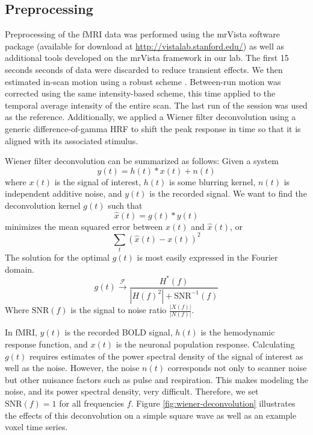 \documentclass[preprint,5p,authoryear]{elsarticle}
\begin{document}
\subsection{Preprocessing}
Preprocessing of the fMRI data was performed using the mrVista software package (available for download at \url{http://vistalab.stanford.edu/}) as well as additional tools developed on the mrVista framework in our lab. 
The first 15 seconds seconds of data  were discarded to reduce transient effects.
We then estimated in-scan motion using a robust scheme \citep{Nestares-and-Heeger-2000}. 
Between-run motion was corrected using the same intensity-based scheme, this time applied to the temporal average intensity of the entire scan. 
The last run of the session was used as the reference. 
Additionally, we applied a Wiener filter deconvolution \citep{Wiener} using a generic difference-of-gamma HRF \citep{Glover} to shift the peak response in time so that it is aligned with its associated stimulus.

Wiener filter deconvolution can be summarized as follows:
Given a system
\begin{equation}
y(t) = h(t) \ast x(t) + n(t)
\end{equation}
where $x(t)$ is the signal of interest, $h(t)$ is some blurring kernel, $n(t)$ is independent additive noise, and $y(t)$ is the recorded signal.
We want to find the deconvolution kernel $g(t)$ such that 
\begin{equation}
\hat{x}(t) = g(t) \ast y(t)
\end{equation}
minimizes the mean squared error between $x(t)$ and $\hat{x}(t)$, or
\begin{equation}
\sum_{t}{\left( \hat{x}(t) - x(t) \right)^{2}}
\end{equation}
The solution for the optimal $g(t)$ is most easily expressed in the Fourier domain.
\begin{equation}
g(t) \xrightarrow{\mathcal{F}} \frac{H^{*}(f)}{\left|H(f)^{2}\right| + \mbox{SNR}^{-1}(f)}
\end{equation}
Where $\mbox{SNR}(f)$ is the signal to noise ratio $\frac{\left| X(f) \right|}{\left| N(f) \right|}$.

In fMRI, $y(t)$ is the recorded BOLD signal, $h(t)$ is the hemodynamic response function, and $x(t)$ is the neuronal population response.
Calculating $g(t)$ requires estimates of the power spectral density of the signal of interest as well as the noise.
However, the noise $n(t)$ corresponds not only to scanner noise but other nuisance factors such as pulse and respiration.
This makes modeling the noise, and its power spectral density, very difficult.
Therefore, we set $\mbox{SNR}(f) = 1$ for all frequencies $f$.
Figure \ref{fig:wiener-deconvolution} illustrates the effects of this deconvolution on a simple square wave as well as an example voxel time series.
\end{document}

